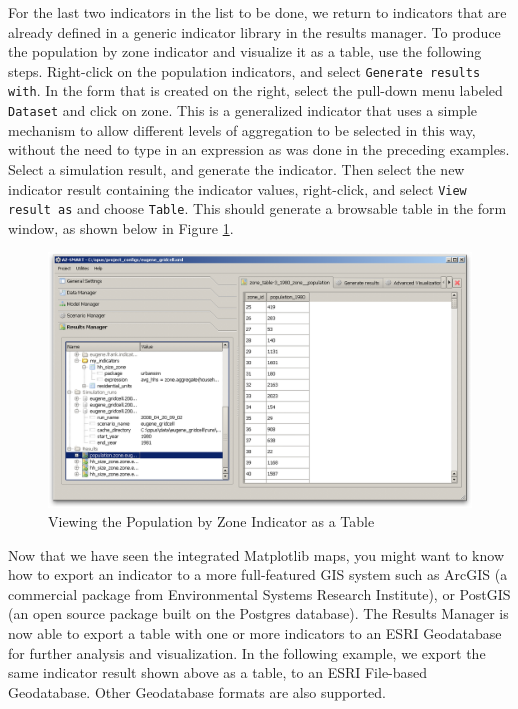 For the last two indicators in the list to be done, we return to indicators that are already defined in a generic indicator library in the results manager.  To produce the population by zone indicator and visualize it as a table, use the following steps.  Right-click on the population indicators, and select \verb#Generate results with#.  In the form that is created on the right, select the pull-down menu labeled \verb#Dataset# and click on zone.  This is a generalized indicator that uses a simple mechanism to allow different levels of aggregation to be selected in this way, without the need to type in an expression as was done in the preceding examples.  Select a simulation result, and generate the indicator.  Then select the new indicator result containing the indicator values, right-click, and select \verb#View result as# and choose \verb#Table#.  This should generate a browsable table in the form window, as shown below in Figure \ref{fig:indicator-population-zone-table}.

\begin{figure}[htp]
\begin{center}
\includegraphics[scale=0.4]{graphics/indicator-population-zone-table.png}
\end{center}
\caption{Viewing the Population by Zone Indicator as a Table}
\label{fig:indicator-population-zone-table}
\end{figure}

Now that we have seen the integrated Matplotlib maps, you might want to know how to export an indicator to a more full-featured GIS system such as ArcGIS (a commercial package from Environmental Systems Research Institute), or PostGIS (an open source package built on the Postgres database).  The Results Manager is now able to export a table with one or more indicators to an ESRI Geodatabase for further analysis and visualization.  In the following example, we export the same indicator result shown above as a table, to an ESRI File-based Geodatabase.  Other Geodatabase formats are also supported.

